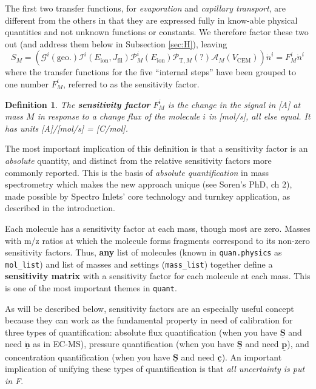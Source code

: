 \documentclass{article}
\newcommand{\code}[1]{\colorbox{codegray}{\lstinline{#1}}}
\renewcommand{\vec}[1]{\underline{\mathbf{#1}}}
\newtheorem{definition}{Definition}
\begin{document}
The first two transfer functions, for \textit{evaporation} and \textit{capillary transport}, are different from the others in that they are expressed fully in know-able physical quantities and not unknown functions or constants. We therefore factor these two out (and address them below in Subsection \ref{sec:H}), leaving 
\begin{equation}
S_M = \left(
\mathcal{G}^i(\text{geo.}) 
\mathcal{I}^i(E_\text{ion}, J_\text{fil})
\mathcal{P}^i_{M}(E_\text{ion})
\mathcal{P}_{\text{T},M}(\text{?})
\mathcal{A}_M(V_\text{CEM})
\right) \dot{n}^i 
= F_M^i \dot{n}^i  \label{eq:F}
\end{equation}
where the transfer functions for the five ``internal steps'' have been grouped to one number $F_M^i$, referred to as the sensitivity factor.
\begin{definition}\label{def:F}
	The \textbf{sensitivity factor} $F^i_M$ is the change in the signal in [A] at mass $M$ in response to a change flux of the molecule $i$ in [mol/s], all else equal. It has units [A]/[mol/s] = [C/mol].
\end{definition}
The most important implication of this definition is that a sensitivity factor is an \textit{absolute} quantity, and distinct from the relative sensitivity factors more commonly reported. This is the basis of \textit{absolute quantification} in mass spectrometry which makes the new approach unique (see Soren's PhD, ch 2), made possible by Spectro Inlets' core technology and turnkey application, as described in the introduction. 

Each molecule has a sensitivity factor at each mass, though most are zero. Masses with m/z ratios at which the molecule forms fragments correspond to its non-zero sensitivity factors. Thus, \textbf{any} list of molecules (known in \code{quan.physics} as \code{mol_list}) and list of masses and settings (\code{mass_list}) together define a \textbf{sensitivity matrix} with a sensitivity factor for each molecule at each mass. This is one of the most important themes in \code{quant}.

As will be described below, sensitivity factors are an especially useful concept because they can work as the fundamental property in need of calibration for three types of quantification: absolute flux quantification (when you have $\vec{S}$ and need $\vec{\dot{n}}$ as in EC-MS), pressure quantification (when you have $\vec{S}$ and need $\vec{p}$), and concentration quantification (when you have $\vec{S}$ and need $\vec{c}$). An important implication of unifying these types of quantification is that \textit{all uncertainty is put in F}. 
\end{document}
